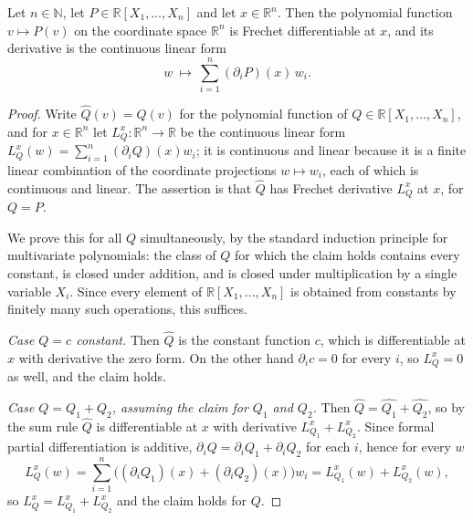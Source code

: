 \begin{lemma}
Let $n\in\mathbb{N}$, let $P\in\mathbb{R}[X_1,\dots,X_n]$ and let $x\in\mathbb{R}^n$.
Then the polynomial function $v\mapsto P(v)$ on the coordinate space
$\mathbb{R}^n$ is Frechet differentiable at $x$, and its derivative is the
continuous linear form
\[
  w\ \longmapsto\ \sum_{i=1}^{n}(\partial_iP)(x)\,w_i .
\]
\end{lemma}
\begin{proof}
Write $\widehat{Q}(v)=Q(v)$ for the polynomial function of
$Q\in\mathbb{R}[X_1,\dots,X_n]$, and for $x\in\mathbb{R}^n$ let
$L_Q^x:\mathbb{R}^n\to\mathbb{R}$ be the continuous linear form
$L_Q^x(w)=\sum_{i=1}^{n}(\partial_iQ)(x)w_i$; it is continuous and linear because
it is a finite linear combination of the coordinate projections
$w\mapsto w_i$, each of which is continuous and linear. The assertion is that
$\widehat{Q}$ has Frechet derivative $L_Q^x$ at $x$, for $Q=P$.

We prove this for all $Q$ simultaneously, by the standard induction principle for
multivariate polynomials: the class of $Q$ for which the claim holds contains
every constant, is closed under addition, and is closed under multiplication by
a single variable $X_i$. Since every element of $\mathbb{R}[X_1,\dots,X_n]$ is
obtained from constants by finitely many such operations, this suffices.

\emph{Case $Q=c$ constant.} Then $\widehat{Q}$ is the constant function $c$,
which is differentiable at $x$ with derivative the zero form. On the other hand
$\partial_ic=0$ for every $i$, so $L_Q^x=0$ as well, and the claim holds.

\emph{Case $Q=Q_1+Q_2$, assuming the claim for $Q_1$ and $Q_2$.} Then
$\widehat{Q}=\widehat{Q_1}+\widehat{Q_2}$, so by the sum rule $\widehat{Q}$ is
differentiable at $x$ with derivative $L_{Q_1}^x+L_{Q_2}^x$. Since formal partial
differentiation is additive, $\partial_i Q=\partial_iQ_1+\partial_iQ_2$ for each
$i$, hence for every $w$
\[
  L_Q^x(w)=\sum_{i=1}^{n}\bigl((\partial_iQ_1)(x)+(\partial_iQ_2)(x)\bigr)w_i
  =L_{Q_1}^x(w)+L_{Q_2}^x(w),
\]
so $L_Q^x=L_{Q_1}^x+L_{Q_2}^x$ and the claim holds for $Q$.


\end{proof}
